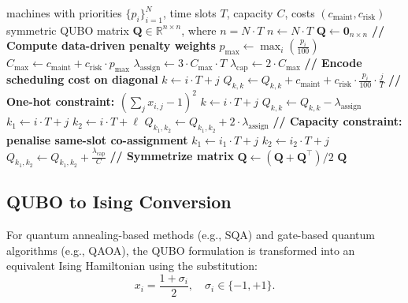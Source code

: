 \begin{algorithm}[!htbp]
\small
\caption{Build QUBO Matrix for Scheduling}
\label{alg:build_qubo}
\begin{algorithmic}[1]
\Require machines with priorities $\{p_i\}_{i=1}^N$, time slots $T$, capacity $C$, costs $(c_{\text{maint}}, c_{\text{risk}})$
\Ensure symmetric QUBO matrix $\mathbf{Q} \in \mathbb{R}^{n \times n}$, where $n = N \cdot T$
\State $n \gets N \cdot T$
\State $\mathbf{Q} \gets \mathbf{0}_{n \times n}$
\Statex \textbf{// Compute data-driven penalty weights}
\State $p_{\max} \gets \max_i \left( \frac{p_i}{100} \right)$
\State $C_{\max} \gets c_{\text{maint}} + c_{\text{risk}} \cdot p_{\max}$
\State $\lambda_{\text{assign}} \gets 3 \cdot C_{\max} \cdot T$
\State $\lambda_{\text{cap}} \gets 2 \cdot C_{\max}$
\Statex \textbf{// Encode scheduling cost on diagonal}
        \State $k \gets i \cdot T + j$
        \State $Q_{k,k} \gets Q_{k,k} + c_{\text{maint}} + c_{\text{risk}} \cdot \frac{p_i}{100} \cdot \frac{j}{T}$
    \EndFor
\EndFor
\Statex \textbf{// One-hot constraint: $(\sum_j x_{i,j} - 1)^2$}
        \State $k \gets i \cdot T + j$
        \State $Q_{k,k} \gets Q_{k,k} - \lambda_{\text{assign}}$
    \EndFor
            \State $k_1 \gets i \cdot T + j$
            \State $k_2 \gets i \cdot T + \ell$
            \State $Q_{k_1,k_2} \gets Q_{k_1,k_2} + 2 \cdot \lambda_{\text{assign}}$
        \EndFor
    \EndFor
\EndFor
\Statex \textbf{// Capacity constraint: penalise same-slot co-assignment}
            \State $k_1 \gets i_1 \cdot T + j$
            \State $k_2 \gets i_2 \cdot T + j$
            \State $Q_{k_1,k_2} \gets Q_{k_1,k_2} + \frac{\lambda_{\text{cap}}}{C}$
        \EndFor
    \EndFor
\EndFor
\Statex \textbf{// Symmetrize matrix}
\State $\mathbf{Q} \gets (\mathbf{Q} + \mathbf{Q}^\top)/2$
\State \Return $\mathbf{Q}$
\end{algorithmic}
\end{algorithm}

\subsection{QUBO to Ising Conversion}
For quantum annealing-based methods (e.g., SQA) and gate-based quantum algorithms (e.g., QAOA), the QUBO formulation is transformed into an equivalent Ising Hamiltonian using the substitution:
\begin{equation}
x_i = \frac{1 + \sigma_i}{2}, \quad \sigma_i \in \{-1, +1\}.
\end{equation}

